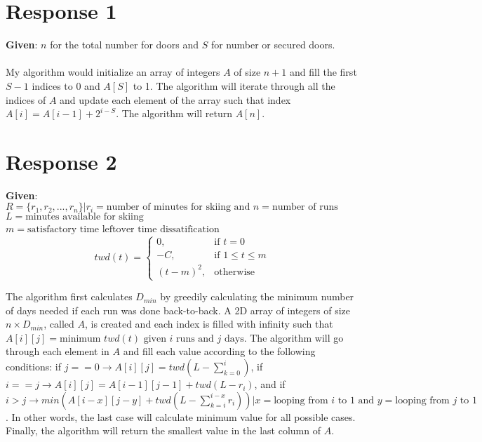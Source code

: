 \documentclass[12pt, a4paper]{article}
\begin{document}
\maketitle
\section*{\centering Response 1}
\textbf{Given}: \(n\) for the total number for doors and \(S\) for number or secured doors.
\\
\\
My algorithm would initialize an array of integers \(A\) of size \(n + 1\) and fill the first \(S-1\) indices to 0 and \(A[S]\) to 1. 
The algorithm will iterate through all the indices of \(A\) and update each element of the array such that index \(A[i] = A[i - 1] + 2^{i - S}\).
The algorithm will return \(A[n]\).

\newpage
\section*{\centering Response 2}
\textbf{Given}: \\
\(R = \{r_1, r_2, ..., r_n\} | r_i = \textrm{number of minutes for skiing and } n = \textrm{number of runs}\) \\
\(L=\textrm{minutes available for skiing}\)\\
\(m = \textrm{satisfactory time leftover}\)
\(\textrm{time dissatification} \)\\
\begin{equation}
    twd(t) = \begin{cases}
        0, & \text{if $t = 0$}\\
        -C, & \text{if $1 \leq t \leq m$}\\
        (t-m)^2, & \text{otherwise}
    \end{cases}
\end{equation}

The algorithm first calculates \(D_{min}\) by greedily calculating the minimum number of days needed if each run was done back-to-back.
A 2D array of integers of size \(n \times D_{min}\), called \(A\), is created and each index is filled with infinity such that \(A[i][j] = \textrm{minimum $twd(t)$ given $i$ runs and $j$ days}\).
The algorithm will go through each element in \(A\) and fill each value according to the following conditions:
if \(j == 0 \rightarrow A[i][j] = twd(L - \sum_{k = 0}^{i})\), if \(i == j \rightarrow A[i][j] = A[i - 1][j - 1] + twd(L - r_i)\), and 
if \(i > j \rightarrow min(A[i - x][j - y] + twd(L - \sum_{k = i}^{i - x}r_i)) | x = \textrm{looping from $i$ to 1 and } y = \textrm{looping from $j$ to 1}\).
In other words, the last case will calculate minimum value for all possible cases.
Finally, the algorithm will return the smallest value in the last column of \(A\).
\end{document}
